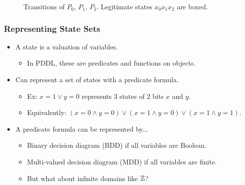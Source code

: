 \documentclass[handout]{beamer}
\begin{document}
\begin{frame}
\begin{figure}
\caption{Transitions of {\color{red!40} $P_0$}, {\color{green!50!black!75} $P_1$}, {\color{blue} $P_2$}. Legitimate states $x_0x_1x_2$ are boxed.}
\end{figure}
\end{frame}


\begin{frame}
\frametitle{Representing State Sets}
\begin{itemize}
\item A state is a valuation of variables.
 \begin{itemize}
 \item In PDDL, these are predicates and functions on objects.
 \end{itemize}
\item Can represent a set of states with a predicate formula.
 \begin{itemize}
 \item Ex: $x=1\vee y=0$ represents $3$ states of $2$ bits $x$ and $y$.
 \item Equivalently: $(x=0\wedge y=0) \vee (x=1\wedge y=0) \vee (x=1\wedge y=1)$.
 \end{itemize}
\item A predicate formula can be represented by...
 \begin{itemize}
 \item Binary decision diagram (BDD) if all variables are Boolean.
 \item Multi-valued decision diagram (MDD) if all variables are finite.
 \item But what about infinite domains like $\mathbb{Z}$?
 \end{itemize}
\end{itemize}
\end{frame}
\end{document}
